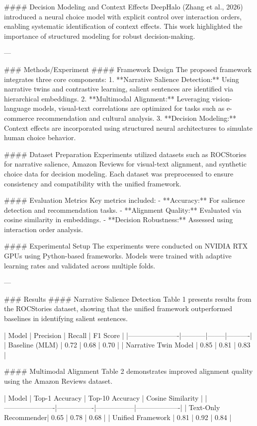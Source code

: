 #### Decision Modeling and Context Effects
DeepHalo (Zhang et al., 2026) introduced a neural choice model with explicit control over interaction orders, enabling systematic identification of context effects. This work highlighted the importance of structured modeling for robust decision-making.

---

### Methods/Experiment
#### Framework Design
The proposed framework integrates three core components:
1. **Narrative Salience Detection:** Using narrative twins and contrastive learning, salient sentences are identified via hierarchical embeddings.
2. **Multimodal Alignment:** Leveraging vision-language models, visual-text correlations are optimized for tasks such as e-commerce recommendation and cultural analysis.
3. **Decision Modeling:** Context effects are incorporated using structured neural architectures to simulate human choice behavior.

#### Dataset Preparation
Experiments utilized datasets such as ROCStories for narrative salience, Amazon Reviews for visual-text alignment, and synthetic choice data for decision modeling. Each dataset was preprocessed to ensure consistency and compatibility with the unified framework.

#### Evaluation Metrics
Key metrics included:
- **Accuracy:** For salience detection and recommendation tasks.
- **Alignment Quality:** Evaluated via cosine similarity in embeddings.
- **Decision Robustness:** Assessed using interaction order analysis.

#### Experimental Setup
The experiments were conducted on NVIDIA RTX GPUs using Python-based frameworks. Models were trained with adaptive learning rates and validated across multiple folds.

---

### Results
#### Narrative Salience Detection
Table 1 presents results from the ROCStories dataset, showing that the unified framework outperformed baselines in identifying salient sentences.

| Model                | Precision | Recall | F1 Score |
|----------------------|-----------|--------|----------|
| Baseline (MLM)       | 0.72      | 0.68   | 0.70     |
| Narrative Twin Model | 0.85      | 0.81   | 0.83     |

#### Multimodal Alignment
Table 2 demonstrates improved alignment quality using the Amazon Reviews dataset.

| Model                | Top-1 Accuracy | Top-10 Accuracy | Cosine Similarity |
|----------------------|----------------|-----------------|-------------------|
| Text-Only Recommender| 0.65           | 0.78            | 0.68              |
| Unified Framework    | 0.81           | 0.92            | 0.84              |


